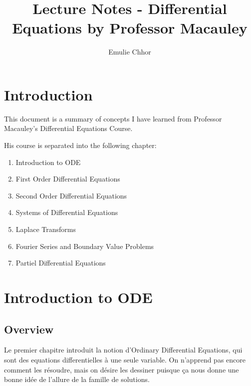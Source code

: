 \documentclass{article}
\begin{document}
\title{Lecture Notes - Differential Equations by Professor Macauley}
\author{Emulie Chhor}
\maketitle

\section*{Introduction}

This document is a summary of concepts I have learned from Professor
Macauley's Differential Equations Course.

His course is separated into the following chapter:
\begin{enumerate}
    \item Introduction to ODE
    \item First Order Differential Equations
    \item Second Order Differential Equations
    \item Systems of Differential Equations
    \item Laplace Transforms
    \item Fourier Series and Boundary Value Problems
    \item Partiel Differential Equations
\end{enumerate}

\newtheorem{definition}{Definition}[subsection]
\newtheorem{theorem}{Theorem}[subsection]
\newtheorem{corollary}{Corollary}[subsection]
\newtheorem{lemma}[theorem]{Lemma}
\newtheorem{proposition}{Proposition}[section]
\newtheorem{axiom}{Axiome}
\newtheorem{property}{Propriété}[subsection]
\newtheorem*{remark}{Remarque}
\newtheorem*{problem}{Problème}
\newtheorem*{intuition}{Intuition}

\pagebreak

\section{Introduction to ODE}
\subsection*{Overview}

Le premier chapitre introduit la notion d'Ordinary Differential Equations,
qui sont des equations differentielles à une seule variable. On
n'apprend pas encore comment les résoudre, mais on désire les dessiner
puisque ça nous donne une bonne idée de l'allure de la famille de solutions.
\end{document}
